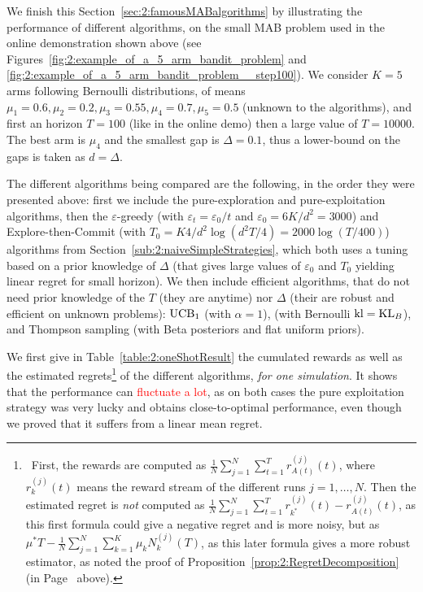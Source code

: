 
We finish this Section~\ref{sec:2:famousMABalgorithms} by illustrating the performance of different algorithms, on the small MAB problem used in the online demonstration shown above (see Figures~\ref{fig:2:example_of_a_5_arm_bandit_problem} and \ref{fig:2:example_of_a_5_arm_bandit_problem__step100}).
We consider $K=5$ arms following Bernoulli distributions, of means $\mu_1=0.6,\mu_2=0.2,\mu_3=0.55,\mu_4=0.7,\mu_5=0.5$ (unknown to the algorithms), and first an horizon $T=100$ (like in the online demo) then a large value of $T=10000$.
The best arm is $\mu_4$ and the smallest gap is $\Delta = 0.1$, thus a lower-bound on the gaps is taken as $d=\Delta$.

The different algorithms being compared are the following, in the order they were presented above:
%
first we include the pure-exploration and
pure-exploitation algorithms,
then the $\varepsilon$-greedy (with $\varepsilon_t=\varepsilon_0/t$ and $\varepsilon_0=6K/d^2=3000$) and
Explore-then-Commit (with $T_0=K4/d^2 \log(d^2T/4)=2000\log(T/400)$) algorithms
from Section~\ref{sub:2:naiveSimpleStrategies}, which both uses a tuning based on a prior knowledge of $\Delta$ (that gives large values of $\varepsilon_0$ and $T_0$ yielding linear regret for small horizon).
%
We then include efficient algorithms, that do not need prior knowledge of the $T$ (they are anytime) nor $\Delta$ (their are robust and efficient on unknown problems):
$\mathrm{UCB}_1$ (with $\alpha=1$),
\klUCB{} (with Bernoulli $\mathrm{kl} = \mathrm{KL}_{B}$),
and Thompson sampling (with Beta posteriors and flat uniform priors).
%

We first give in Table~\ref{table:2:oneShotResult} the cumulated rewards as well as the estimated regrets\footnote{~First, the rewards are computed as $\frac{1}{N} \sum_{j=1}^N \sum_{t=1}^T r^{(j)}_{A(t)}(t)$, where $r^{(j)}_{k}(t)$ means the reward stream of the different runs $j=1,\dots,N$. Then the estimated regret is \emph{not} computed as $\frac{1}{N} \sum_{j=1}^N \sum_{t=1}^T r^{(j)}_{k^*}(t) - r^{(j)}_{A(t)}(t)$, as this first formula could give a negative regret and is more noisy, but as $\mu^* T - \frac{1}{N} \sum_{j=1}^N \sum_{k=1}^K \mu_k N^{(j)}_{k}(T)$, as this later formula gives a more robust estimator, as noted the proof of Proposition~\ref{prop:2:RegretDecomposition} (in Page~\pageref{remark:2:moreAccurateCountofRegretForSimulations} above).}
of the different algorithms, \emph{for one simulation}.
%
It shows that the performance can \textcolor{red}{fluctuate a lot}, as on both cases the pure exploitation strategy was very lucky and obtains close-to-optimal performance, even though we proved that it suffers from a linear mean regret.

